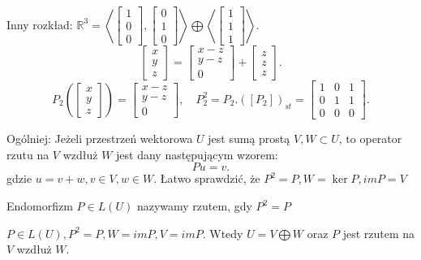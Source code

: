 \documentclass[../main.tex]{subfiles}
\begin{document}
\begin{przyklad}
    Inny rozkład: $\mathbb{R}^3 = \left<\begin{bmatrix} 1\\0\\0 \end{bmatrix} , \begin{bmatrix} 0\\1\\0 \end{bmatrix}  \right> \bigoplus \left<\begin{bmatrix} 1\\1\\1 \end{bmatrix}  \right>$.
    \[
        \begin{bmatrix} x\\y\\z \end{bmatrix} = \begin{bmatrix} x-z\\y-z\\0 \end{bmatrix} + \begin{bmatrix} z\\z\\z \end{bmatrix}
    .\]
    \[
        P_2\left( \begin{bmatrix} x\\y\\z \end{bmatrix}  \right) = \begin{bmatrix} x-z\\y-z\\0 \end{bmatrix},\quad P_2^2 = P_2. \left([P_2]\right)_{st} = \begin{bmatrix} 1&0&1\\0&1&1\\0&0&0 \end{bmatrix}
    .\]
\end{przyklad}
Ogólniej: Jeżeli przestrzeń wektorowa  $U$ jest sumą prostą $V, W\subset U$, to operator rzutu na $V$ wzdłuż $W$ jest dany następującym wzorem: \[
Pu = v
.\] gdzie $u = v+w, v\in V, w\in W$. Łatwo sprawdzić, że  $P^2 = P, W = \ker P, im P = V$
 \begin{definicja}
     Endomorfizm $P\in L(U)$ nazywamy rzutem, gdy $P^2 = P$
\end{definicja}
\begin{stw}
    $P\in L(U), P^2 = P, W = im P, V = im P$. Wtedy $U = V \bigoplus W$ oraz $P$ jest rzutem na $V$ wzdłuż $W$.
\end{stw}
\end{document}
